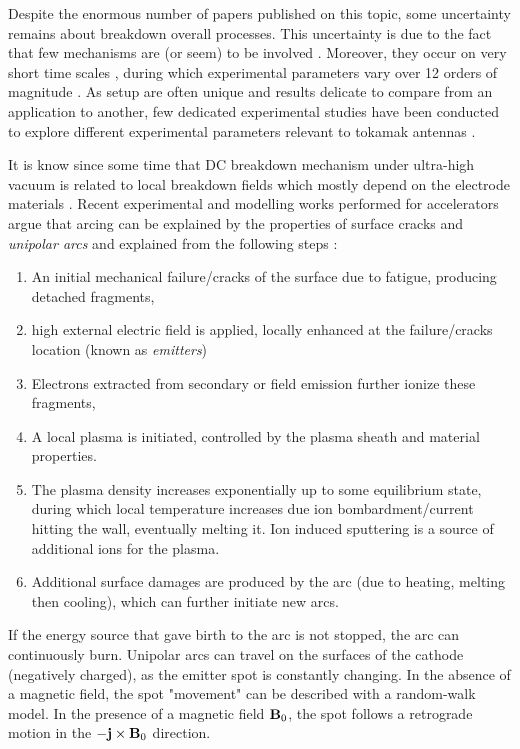 Despite the enormous number of papers published on this topic, some uncertainty remains about breakdown overall processes. This uncertainty is due to the fact that few mechanisms are (or seem) to be involved . Moreover, they occur on very short time scales , during which experimental parameters vary over 12 orders of magnitude \cite{Timko2011}. As setup are often unique and results delicate to compare from an application to another, few dedicated experimental studies have been conducted to explore different  experimental parameters relevant to tokamak antennas .

It is know since some time that DC breakdown mechanism under ultra-high vacuum is related to local breakdown fields which mostly depend on the electrode materials . Recent experimental and modelling works performed for accelerators argue that arcing can be explained by the properties of surface cracks and \textit{unipolar arcs} and explained from the following steps :
\begin{enumerate}
\item An initial mechanical failure/cracks of the surface due to fatigue, producing detached fragments,
\item high external electric field is applied, locally enhanced at the failure/cracks location (known as \textit{emitters})
\item Electrons extracted from secondary or field emission further ionize these fragments,
\item A local plasma is initiated, controlled by the plasma sheath and material properties. 
\item The plasma density increases exponentially up to some equilibrium state, during which local temperature increases due ion bombardment/current hitting the wall, eventually melting it. Ion induced sputtering is a source of additional ions for the plasma.
\item Additional surface damages are produced by the arc (due to heating, melting then cooling), which can further initiate new arcs.
\end{enumerate}
If the energy source that gave birth to the arc is not stopped, the arc can continuously burn. Unipolar arcs can travel on the surfaces of the cathode (negatively charged), as the emitter spot is constantly changing. In the absence of a magnetic field, the spot "movement" can be described with a random-walk model. In the presence of a magnetic field ${\mathbf B}_0$, the spot follows a retrograde motion in the $-{\mathbf j}\times{\mathbf B}_0$ direction. 


